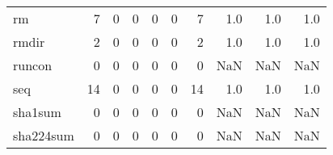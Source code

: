 \begin{tabular}{lrrrrrrrrr}
rm        &                                                  7 &                                                  0 &                                                  0 &                                                  0 &                                                  0 &                                                  7 &                                                1.0 &                                    1.0 &                                  1.0 \\
rmdir     &                                                  2 &                                                  0 &                                                  0 &                                                  0 &                                                  0 &                                                  2 &                                                1.0 &                                    1.0 &                                  1.0 \\
runcon    &                                                  0 &                                                  0 &                                                  0 &                                                  0 &                                                  0 &                                                  0 &                                                NaN &                                    NaN &                                  NaN \\
seq       &                                                 14 &                                                  0 &                                                  0 &                                                  0 &                                                  0 &                                                 14 &                                                1.0 &                                    1.0 &                                  1.0 \\
sha1sum   &                                                  0 &                                                  0 &                                                  0 &                                                  0 &                                                  0 &                                                  0 &                                                NaN &                                    NaN &                                  NaN \\
sha224sum &                                                  0 &                                                  0 &                                                  0 &                                                  0 &                                                  0 &                                                  0 &                                                NaN &                                    NaN &                                  NaN \\

\end{tabular}
